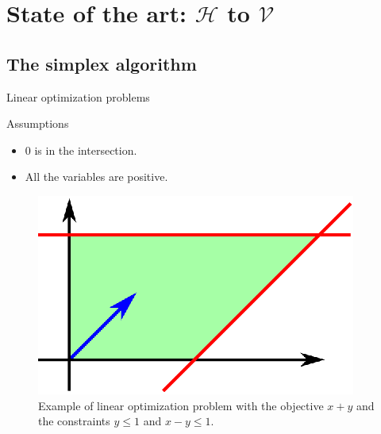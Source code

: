 \section{State of the art: $\mathcal{H}$ to $\mathcal{V}$}
\subsection{The simplex algorithm}

\begin{frame}{Linear optimization problems}
\begin{block}{Assumptions}
\begin{itemize}
\item $0$ is in the intersection.
\item All the variables are positive.
\end{itemize}
\end{block}
\begin{figure}
\includegraphics[scale=1]{images/simplex1.eps}\\
Example of linear optimization problem with the objective $x+y$ and the constraints $y\leq 1$ and $x-y\leq 1$.
\end{figure}
\end{frame}

